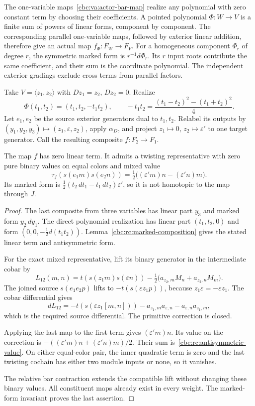 The one-variable maps~\eqref{cbc:va:actor-bar-map}
realize any polynomial with zero constant term by
choosing their coefficients. A pointed polynomial
$\Phi:W\to V$ is a finite sum of powers of linear
forms, component by component. The corresponding
parallel one-variable maps, followed by exterior
linear addition, therefore give an actual map
$f_\Phi:F_W\to F_V$. For a homogeneous component $\Phi_r$ of degree $r$, the symmetric
marked form is $r^{-1}d\Phi_r$. Its $r$ input roots contribute the
same coefficient, and their sum is the coordinate polynomial. The independent exterior
gradings exclude cross terms from parallel factors.

Take $V=\langle z_1,z_2\rangle$ with
$Dz_1=z_2$, $Dz_2=0$. Realize
\[
 \Phi(t_1,t_2)=(t_1,t_2,-t_1t_2),
 \qquad
 -t_1t_2=\frac{(t_1-t_2)^2-(t_1+t_2)^2}{4}.
\]
Let $e_1,e_2$ be the source exterior generators dual to $t_1,t_2$.
Relabel its outputs by
$(y_1,y_2,y_3)\mapsto(z_1,\varepsilon,z_2)$,
apply $\alpha_D$, and project $z_1\mapsto0$,
$z_2\mapsto\varepsilon'$ to one target generator.
Call the resulting composite $f:F_2\to F_1$.

\begin{proposition}\label{cbc:rc:antisymmetric-map}
The map $f$ has zero linear term. It admits a twisting representative
with zero pure binary values on equal colors and mixed value
\begin{equation}\label{cbc:rc:antisymmetric-value}
 \tau_f(s(e_1m)s(e_2n))
  =\tfrac12\bigl((\varepsilon'm)n-(\varepsilon'n)m\bigr).
\end{equation}
Its marked form is
$\tfrac12(t_2\,dt_1-t_1\,dt_2)\varepsilon'$,
so it is not homotopic to the map through $J$.
\end{proposition}
\begin{proof}
The last composite from three variables has linear
part $y_3$ and marked form $y_2\,dy_1$.
The direct polynomial realization has linear part
$(t_1,t_2,0)$ and form
$(0,0,-\tfrac12d(t_1t_2))$.
Lemma~\ref{cbc:rc:marked-composition} gives the
stated linear term and antisymmetric form.

For the exact mixed representative, lift its
binary generator in the intermediate cobar by
\[
 L_{12}(m,n)=t(s(z_1m)s(\varepsilon n))
  -\tfrac12\bigl(a_{z_2,m}M_n+a_{z_2,n}M_m\bigr).
\]
The joined source $s(e_1e_2p)$ lifts to
$-t(s(\varepsilon z_1p))$, because
$z_1\varepsilon=-\varepsilon z_1$.
The cobar differential gives
\[
 dL_{12}=-t(s(\varepsilon z_1[m,n]))
         -a_{z_1,m}a_{\varepsilon,n}
         -a_{\varepsilon,n}a_{z_1,m},
\]
which is the required source differential.
The primitive correction is closed.

Applying the last map to the first term gives
$(\varepsilon'm)n$. Its value on the correction
is $-((\varepsilon'm)n+(\varepsilon'n)m)/2$.
Their sum is~\eqref{cbc:rc:antisymmetric-value}.
On either equal-color pair, the inner quadratic
term is zero and the last twisting cochain has
either two module inputs or none, so it vanishes.

The relative bar contraction extends the compatible
lift without changing these binary values.
All constituent maps already exist in every
weight. The marked-form invariant proves the
last assertion.
\end{proof}

